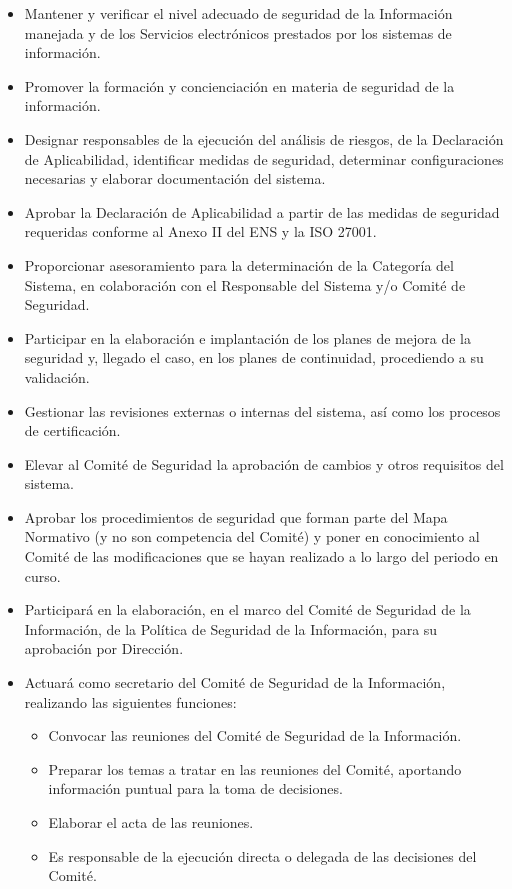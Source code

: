 \begin{enumerate}[label=\alph*)]
\begin{itemize}
  \item Mantener y verificar el nivel adecuado de seguridad de la Información manejada y de los Servicios electrónicos prestados por los sistemas de información.
  \item Promover la formación y concienciación en materia de seguridad de la información.
  \item Designar responsables de la ejecución del análisis de riesgos, de la Declaración de Aplicabilidad, identificar medidas de seguridad, determinar configuraciones necesarias y elaborar documentación del sistema.
  \item Aprobar la Declaración de Aplicabilidad a partir de las medidas de seguridad requeridas conforme al Anexo II del ENS y la ISO 27001.
  \item Proporcionar asesoramiento para la determinación de la Categoría del Sistema, en colaboración con el Responsable del Sistema y/o Comité de Seguridad.
  \item Participar en la elaboración e implantación de los planes de mejora de la seguridad y, llegado el caso, en los planes de continuidad, procediendo a su validación.
  \item Gestionar las revisiones externas o internas del sistema, así como los procesos de certificación.
  \item Elevar al Comité de Seguridad la aprobación de cambios y otros requisitos del sistema.
  \item Aprobar los procedimientos de seguridad que forman parte del Mapa Normativo (y no son competencia del Comité) y poner en conocimiento al Comité de las modificaciones que se hayan realizado a lo largo del periodo en curso.
  \item Participará en la elaboración, en el marco del Comité de Seguridad de la Información, de la Política de Seguridad de la Información, para su aprobación por Dirección.
  \item Actuará como secretario del Comité de Seguridad de la Información, realizando las siguientes funciones:
  \begin{itemize}
    \item Convocar las reuniones del Comité de Seguridad de la Información.
    \item Preparar los temas a tratar en las reuniones del Comité, aportando información puntual para la toma de decisiones.
    \item Elaborar el acta de las reuniones.
    \item Es responsable de la ejecución directa o delegada de las decisiones del Comité.
  \end{itemize}
\end{itemize}


\end{enumerate}
